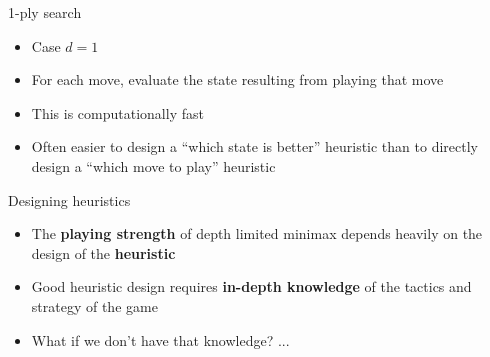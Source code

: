 \begin{frame}{1-ply search}
	\begin{itemize}
		\pause\item Case $d=1$
		\pause\item For each move, evaluate the state resulting from playing that move
		\pause\item This is computationally fast
		\pause\item Often easier to design a ``which state is better'' heuristic than to directly design a ``which move to play'' heuristic
	\end{itemize}
\end{frame}


\begin{frame}{Designing heuristics}
	\begin{itemize}
		\pause\item The \textbf{playing strength} of depth limited minimax depends heavily on the design of the \textbf{heuristic}
		\pause\item Good heuristic design requires \textbf{in-depth knowledge} of the tactics and strategy of the game
		\pause\item What if we don't have that knowledge? ...
	\end{itemize}
\end{frame}

